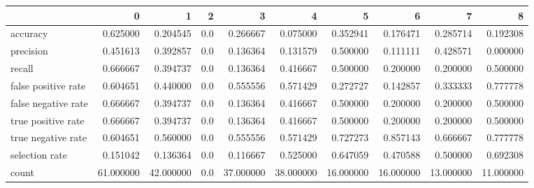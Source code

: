 \begin{tabular}{lrrrrrrrrr}
\toprule
{} &          0 &          1 &    2 &          3 &          4 &          5 &          6 &          7 &          8 \\
\midrule
accuracy            &   0.625000 &   0.204545 &  0.0 &   0.266667 &   0.075000 &   0.352941 &   0.176471 &   0.285714 &   0.192308 \\
precision           &   0.451613 &   0.392857 &  0.0 &   0.136364 &   0.131579 &   0.500000 &   0.111111 &   0.428571 &   0.000000 \\
recall              &   0.666667 &   0.394737 &  0.0 &   0.136364 &   0.416667 &   0.500000 &   0.200000 &   0.200000 &   0.500000 \\
false positive rate &   0.604651 &   0.440000 &  0.0 &   0.555556 &   0.571429 &   0.272727 &   0.142857 &   0.333333 &   0.777778 \\
false negative rate &   0.666667 &   0.394737 &  0.0 &   0.136364 &   0.416667 &   0.500000 &   0.200000 &   0.200000 &   0.500000 \\
true positive rate  &   0.666667 &   0.394737 &  0.0 &   0.136364 &   0.416667 &   0.500000 &   0.200000 &   0.200000 &   0.500000 \\
true negative rate  &   0.604651 &   0.560000 &  0.0 &   0.555556 &   0.571429 &   0.727273 &   0.857143 &   0.666667 &   0.777778 \\
selection rate      &   0.151042 &   0.136364 &  0.0 &   0.116667 &   0.525000 &   0.647059 &   0.470588 &   0.500000 &   0.692308 \\
count               &  61.000000 &  42.000000 &  0.0 &  37.000000 &  38.000000 &  16.000000 &  16.000000 &  13.000000 &  11.000000 \\
\bottomrule
\end{tabular}
